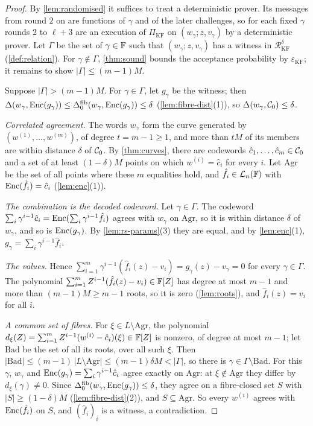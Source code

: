 \begin{proof}
By \cref{lem:randomised} it suffices to treat a deterministic prover. Its messages from round $2$ on are functions of $\gamma$ and of the later challenges, so for each fixed $\gamma$ rounds $2$ to $\ell+3$ are an execution of $\Pi_{\mathrm{KF}}$ on $(w_\gamma; z, v_\gamma)$ by a deterministic prover.
Let $\Gamma$ be the set of $\gamma \in \mathbb{F}$ such that $(w_\gamma; z, v_\gamma)$ has a witness in $\mathcal{R}^\delta_{\mathrm{KF}}$ (\cref{def:relation}).
For $\gamma \notin \Gamma$, \cref{thm:sound} bounds the acceptance probability by $\varepsilon_{\mathrm{KF}}$; it remains to show $|\Gamma| \le (m-1)M$.

Suppose $|\Gamma| > (m-1)M$. For $\gamma \in \Gamma$, let $g_\gamma$ be the witness; then $\Delta(w_\gamma, \mathrm{Enc}(g_\gamma)) \le \Delta^{\mathrm{fib}}_0(w_\gamma, \mathrm{Enc}(g_\gamma)) \le \delta$ (\cref{lem:fibre-dist}(1)), so $\Delta(w_\gamma, \mathcal{C}_0) \le \delta$.

\emph{Correlated agreement.} The words $w_\gamma$ form the curve generated by $(w^{(1)}, \dots, w^{(m)})$, of degree $t = m-1 \ge 1$, and more than $tM$ of its members are within distance $\delta$ of $\mathcal{C}_0$. By \cref{thm:curves}, there are codewords $\hat c_1, \dots, \hat c_m \in \mathcal{C}_0$ and a set of at least $(1-\delta)M$ points on which $w^{(i)} = \hat c_i$ for every $i$. Let $\mathrm{Agr}$ be the set of all points where these $m$ equalities hold, and $\hat f_i \in \mathcal{L}_n(\mathbb{F})$ with $\mathrm{Enc}(\hat f_i) = \hat c_i$ (\cref{lem:enc}(1)).

\emph{The combination is the decoded codeword.} Let $\gamma \in \Gamma$. The codeword $\sum_i \gamma^{i-1}\hat c_i = \mathrm{Enc}(\sum_i \gamma^{i-1}\hat f_i)$ agrees with $w_\gamma$ on $\mathrm{Agr}$, so it is within distance $\delta$ of $w_\gamma$, and so is $\mathrm{Enc}(g_\gamma)$. By \cref{lem:rs-params}(3) they are equal, and by \cref{lem:enc}(1), $g_\gamma = \sum_i \gamma^{i-1} \hat f_i$.

\emph{The values.} Hence $\sum_{i=1}^{m} \gamma^{i-1}(\hat f_i(z) - v_i) = g_\gamma(z) - v_\gamma = 0$ for every $\gamma \in \Gamma$.
The polynomial $\sum_{i=1}^{m} Z^{i-1}(\hat f_i(z) - v_i) \in \mathbb{F}[Z]$ has degree at most $m-1$ and more than $(m-1)M \ge m-1$ roots, so it is zero (\cref{lem:roots}), and $\hat f_i(z) = v_i$ for all $i$.

\emph{A common set of fibres.} For $\xi \in L \setminus \mathrm{Agr}$, the polynomial $d_\xi(Z) = \sum_{i=1}^{m} Z^{i-1}(w^{(i)} - \hat c_i)(\xi) \in \mathbb{F}[Z]$ is nonzero, of degree at most $m-1$; let $\mathrm{Bad}$ be the set of all its roots, over all such $\xi$. Then $|\mathrm{Bad}| \le (m-1)\,|L \setminus \mathrm{Agr}| \le (m-1)\delta M < |\Gamma|$, so there is $\gamma \in \Gamma \setminus \mathrm{Bad}$.
For this $\gamma$, $w_\gamma$ and $\mathrm{Enc}(g_\gamma) = \sum_i \gamma^{i-1}\hat c_i$ agree exactly on $\mathrm{Agr}$: at $\xi \notin \mathrm{Agr}$ they differ by $d_\xi(\gamma) \ne 0$.
Since $\Delta^{\mathrm{fib}}_0(w_\gamma, \mathrm{Enc}(g_\gamma)) \le \delta$, they agree on a fibre-closed set $S$ with $|S| \ge (1-\delta)M$ (\cref{lem:fibre-dist}(2)), and $S \subseteq \mathrm{Agr}$. So every $w^{(i)}$ agrees with $\mathrm{Enc}(\hat f_i)$ on $S$, and $(\hat f_i)_i$ is a witness, a contradiction.
\end{proof}

